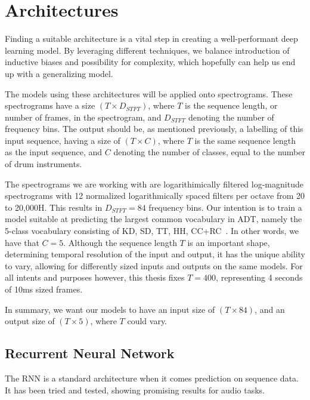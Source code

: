 \chapter{Architectures}\label{Architectures}

Finding a suitable architecture is a vital step in creating a well-performant deep learning model. By leveraging different techniques, we balance introduction of inductive biases and possibility for complexity, which hopefully can help us end up with a generalizing model.

The models using these architectures will be applied onto spectrograms. These spectrograms have a size $(T \times D_{STFT})$, where $T$ is the sequence length, or number of frames, in the spectrogram, and $D_{STFT}$ denoting the number of frequency bins. The output should be, as mentioned previously, a labelling of this input sequence, having a size of $(T \times C)$, where $T$ is the same sequence length as the input sequence, and $C$ denoting the number of classes, equal to the number of drum instruments.

The spectrograms we are working with are logarithimically filtered log-magnitude spectrograms with 12 normalized logarithmically spaced filters per octave from 20 to 20,000H. This results in $D_{STFT} = 84$ frequency bins. Our intention is to train a model suitable at predicting the largest common vocabulary in \gls{ADT}, namely the 5-class vocabulary consisting of \acrfull{KD}, \acrfull{SD}, \acrfull{TT}, \acrfull{HH}, \acrfull{CC+RC}~\cite{zehren2024analyzingreducingsynthetictorealtransfer}. In other words, we have that $C = 5$.
Although the sequence length $T$ is an important shape, determining temporal resolution of the input and output, it has the unique ability to vary, allowing for differently sized inputs and outputs on the same models. For all intents and purposes however, this thesis fixes $T = 400$, representing 4 seconds of 10ms sized frames.

In summary, we want our models to have an input size of $(T \times 84)$, and an output size of $(T \times 5)$, where $T$ could vary.

\section{Recurrent Neural Network}

The \gls{RNN} is a standard architecture when it comes prediction on sequence data. It has been tried and tested, showing promising results for audio tasks.

